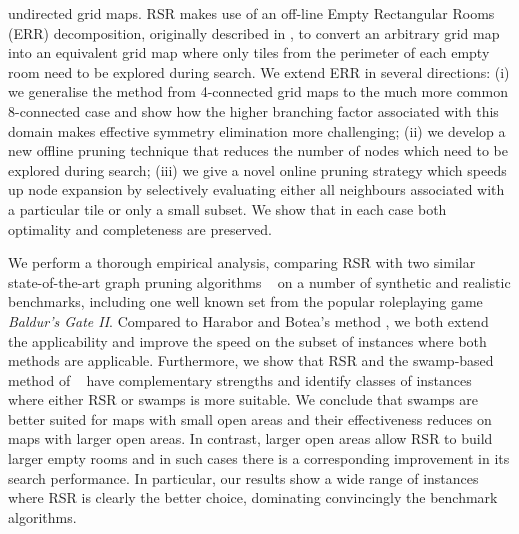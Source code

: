 undirected grid maps.
RSR makes use of an off-line Empty Rectangular Rooms (ERR) decomposition, originally described in
\cite{harabor10}, to convert an arbitrary grid map into an equivalent grid map where only tiles from the 
perimeter of each empty room need to be explored during search.
We extend ERR in several directions: (i) we generalise the method from 4-connected grid maps to 
the much more common 8-connected case and show how the higher branching factor associated 
with this domain makes effective symmetry elimination more challenging;
(ii) we develop a new offline pruning technique that reduces the number of nodes which
need to be explored during search;
(iii) we give a novel online pruning strategy which speeds up node expansion by selectively 
evaluating either all neighbours associated with a particular tile or only a small subset.
We show that in each case both optimality and completeness are preserved.
\par
We perform a thorough empirical analysis, comparing RSR with two similar
state-of-the-art graph pruning algorithms ~\cite{pochter10,harabor10}
on a number of synthetic and realistic benchmarks, including one well known set 
from the popular roleplaying game \emph{Baldur's Gate II}.
Compared to Harabor and Botea's method , 
we both extend the applicability and improve the speed
on the subset of instances where both methods are applicable.
Furthermore, we show that RSR and the swamp-based method of 
\citeauthor{pochter10}~
have complementary strengths and identify classes of instances where
either RSR or swamps is more suitable.
We conclude that swamps are better suited for maps with
small open areas and their effectiveness reduces on maps with larger open areas.
In contrast, larger open areas allow RSR to build larger empty rooms and in such
cases there is a corresponding improvement in its search performance.
In particular, our results show a wide range of instances where
RSR is clearly the better choice, dominating convincingly the benchmark algorithms.


